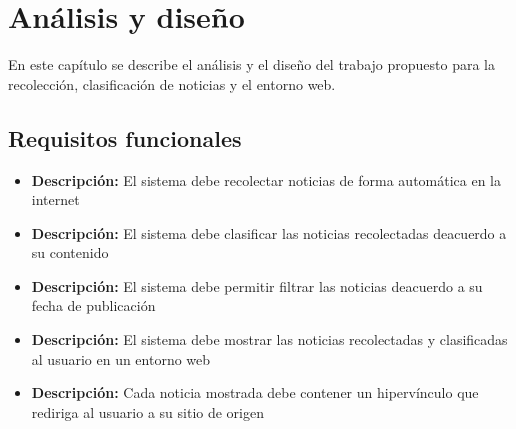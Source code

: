 \chapter{Análisis y diseño}\label{chp:introduccion}

En este capítulo se describe el análisis y el diseño del trabajo propuesto para
la recolección, clasificación de noticias y el entorno web.

\section{Requisitos funcionales}

    \begin{itemize}
      \item \textbf{Descripción:} El sistema debe recolectar noticias de forma automática en la internet\\
    \end{itemize}
    \begin{itemize}
      \item \textbf{Descripción:} El sistema debe clasificar las noticias recolectadas deacuerdo a su contenido\\
    \end{itemize}
    \begin{itemize}
      \item \textbf{Descripción:} El sistema debe permitir filtrar las noticias deacuerdo a su fecha de publicación\\
    \end{itemize}
    \begin{itemize}
      \item \textbf{Descripción:} El sistema debe mostrar las noticias recolectadas y clasificadas al usuario en un entorno web\\
    \end{itemize}
    \begin{itemize}
      \item \textbf{Descripción:} Cada noticia mostrada debe contener un hipervínculo que rediriga al usuario a su sitio de origen\\
    \end{itemize}


